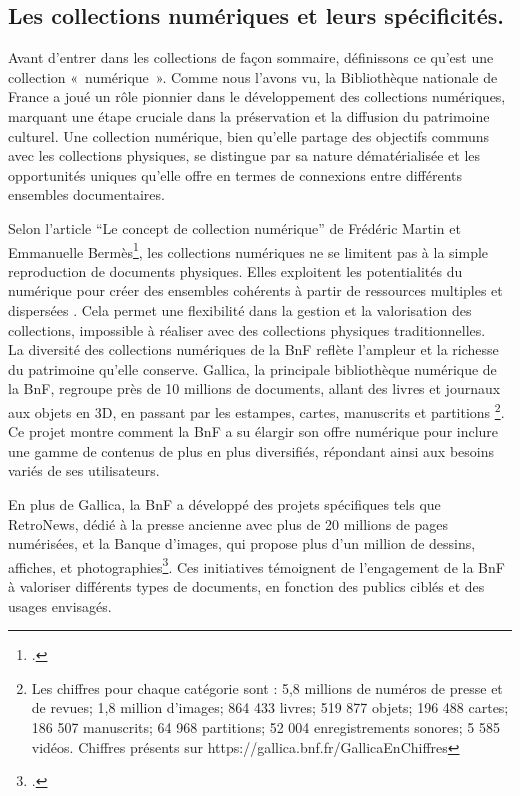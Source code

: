 \documentclass[a4paper,12pt,twoside]{book}
\begin{document}
	\subsection{Les  collections numériques et leurs spécificités.}
	
	Avant d’entrer dans les collections de façon sommaire, définissons ce qu’est une collection « numérique ». Comme nous l’avons vu, la Bibliothèque nationale de France a joué un rôle pionnier dans le développement des collections numériques, marquant une étape cruciale dans la préservation et la diffusion du patrimoine culturel. Une collection numérique, bien qu’elle partage des objectifs communs avec les collections physiques, se distingue par sa nature dématérialisée et les opportunités uniques qu’elle offre en termes de connexions entre différents ensembles documentaires.
	
	Selon l’article “Le concept de collection numérique” de Frédéric Martin et Emmanuelle Bermès\footcite{martin_concept_2010}, les collections numériques ne se limitent pas à la simple reproduction de documents physiques. Elles exploitent les potentialités du numérique pour créer des ensembles cohérents à partir de ressources multiples et dispersées . Cela permet une flexibilité dans la gestion et la valorisation des collections, impossible à réaliser avec des collections physiques traditionnelles.
	\\
	
	La diversité des collections numériques de la BnF reflète l’ampleur et la richesse du patrimoine qu’elle conserve. Gallica, la principale bibliothèque numérique de la BnF, regroupe près de 10 millions de documents, allant des livres et journaux aux objets en 3D, en passant par les estampes, cartes, manuscrits et partitions \footnote{Les chiffres pour chaque catégorie sont : 5,8 millions de numéros de presse et de revues; 1,8 million d’images; 864 433 livres; 519 877 objets; 196 488 cartes; 186 507 manuscrits; 64 968 partitions; 52 004 enregistrements sonores; 5 585 vidéos. Chiffres présents sur https://gallica.bnf.fr/GallicaEnChiffres}. Ce projet montre comment la BnF a su élargir son offre numérique pour inclure une gamme de contenus de plus en plus diversifiés, répondant ainsi aux besoins variés de ses utilisateurs.
	
	En plus de Gallica, la BnF a développé des projets spécifiques tels que RetroNews, dédié à la presse ancienne avec plus de 20 millions de pages numérisées, et la Banque d’images, qui propose plus d’un million de dessins, affiches, et photographies\footcite{leroy-terquem_milles_2023}. Ces initiatives témoignent de l’engagement de la BnF à valoriser différents types de documents, en fonction des publics ciblés et des usages envisagés.
	\\
	
\end{document}
